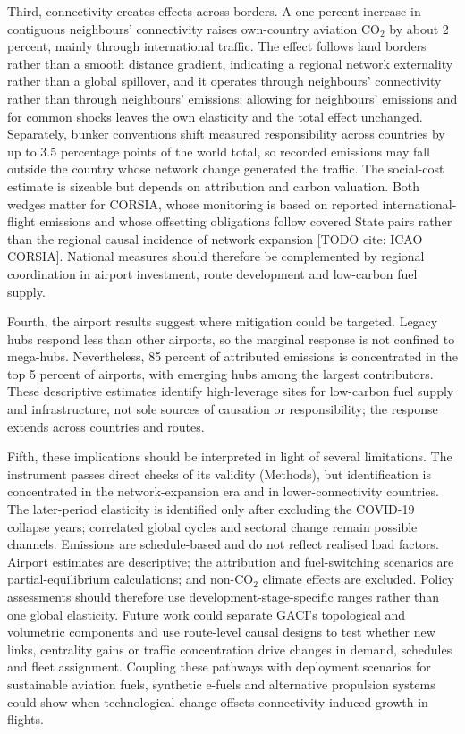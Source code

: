 \documentclass[12pt]{extarticle}
\begin{document}
Third, connectivity creates effects across borders. A one percent increase in contiguous neighbours' connectivity raises own-country aviation CO$_2$ by about 2 percent, mainly through international traffic. The effect follows land borders rather than a smooth distance gradient, indicating a regional network externality rather than a global spillover, and it operates through neighbours' connectivity rather than through neighbours' emissions: allowing for neighbours' emissions and for common shocks leaves the own elasticity and the total effect unchanged. Separately, bunker conventions shift measured responsibility across countries by up to 3.5 percentage points of the world total, so recorded emissions may fall outside the country whose network change generated the traffic. The social-cost estimate is sizeable but depends on attribution and carbon valuation. Both wedges matter for CORSIA, whose monitoring is based on reported international-flight emissions and whose offsetting obligations follow covered State pairs rather than the regional causal incidence of network expansion [TODO cite: ICAO CORSIA]. National measures should therefore be complemented by regional coordination in airport investment, route development and low-carbon fuel supply.

Fourth, the airport results suggest where mitigation could be targeted. Legacy hubs respond less than other airports, so the marginal response is not confined to mega-hubs. Nevertheless, 85 percent of attributed emissions is concentrated in the top 5 percent of airports, with emerging hubs among the largest contributors. These descriptive estimates identify high-leverage sites for low-carbon fuel supply and infrastructure, not sole sources of causation or responsibility; the response extends across countries and routes.

Fifth, these implications should be interpreted in light of several limitations. The instrument passes direct checks of its validity (Methods), but identification is concentrated in the network-expansion era and in lower-connectivity countries. The later-period elasticity is identified only after excluding the COVID-19 collapse years; correlated global cycles and sectoral change remain possible channels. Emissions are schedule-based and do not reflect realised load factors. Airport estimates are descriptive; the attribution and fuel-switching scenarios are partial-equilibrium calculations; and non-CO$_2$ climate effects are excluded. Policy assessments should therefore use development-stage-specific ranges rather than one global elasticity. Future work could separate GACI's topological and volumetric components and use route-level causal designs to test whether new links, centrality gains or traffic concentration drive changes in demand, schedules and fleet assignment. Coupling these pathways with deployment scenarios for sustainable aviation fuels, synthetic e-fuels and alternative propulsion systems could show when technological change offsets connectivity-induced growth in flights.
\end{document}
